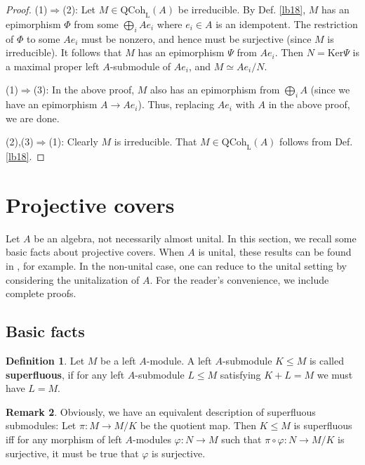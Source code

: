 \documentclass[11pt,b5paper,notitlepage]{article}
\theoremstyle{definition}
\newtheorem{df}{Definition}[section]
\newtheorem{rem}[df]{Remark}
\theoremstyle{plain}
\newcommand{\Ker}{\mathrm{Ker}}
\newcommand{\QC}{\mathrm{QCoh}_{\mathrm L}}
\numberwithin{equation}{section}
\begin{document}
\begin{proof}
(1)$\Rightarrow$(2): Let $M\in\QC(A)$ be irreducible. By Def. \ref{lb18}, $M$ has an epimorphism $\Phi$ from some $\bigoplus_i Ae_i$ where $e_i\in A$ is an idempotent. The restriction of $\Phi$ to some $Ae_i$ must be nonzero, and hence must be surjective (since $M$ is irreducible). It follows that $M$ has an epimorphism $\Psi$ from $Ae_i$. Then $N=\Ker\Psi$ is a maximal proper left $A$-submodule of $Ae_i$, and $M\simeq Ae_i/N$.

(1)$\Rightarrow$(3): In the above proof, $M$ also has an epimorphism from $\bigoplus_i A$ (since we have an epimorphism $A\rightarrow Ae_i$). Thus, replacing $Ae_i$ with $A$ in the above proof, we are done.

(2),(3)$\Rightarrow$(1): Clearly $M$ is irreducible. That $M\in\QC(A)$ follows from Def. \ref{lb18}.
\end{proof}





\section{Projective covers}

Let $A$ be an algebra, not necessarily almost unital. In this section, we recall some basic facts about projective covers. When $A$ is unital, these results can be found in \cite{AF-rings}, for example. In the non-unital case, one can reduce to the unital setting by considering the unitalization of $A$. For the reader’s convenience, we include complete proofs.


\subsection{Basic facts}

\begin{df}
Let $M$ be a left $A$-module. A left $A$-submodule $K\leq M$ is called \textbf{superfluous}, if for any left $A$-submodule $L\leq M$ satisfying $K+L=M$ we must have $L=M$.
\end{df}

\begin{rem}\label{lb21}
Obviously, we have an equivalent description of superfluous submodules: Let $\pi:M\rightarrow M/K$ be the quotient map. Then $K\leq M$ is superfluous iff for any morphism of left $A$-modules $\varphi:N\rightarrow M$ such that $\pi\circ\varphi:N\rightarrow M/K$ is surjective, it must be true that $\varphi$ is surjective.
\end{rem}
\end{document}
